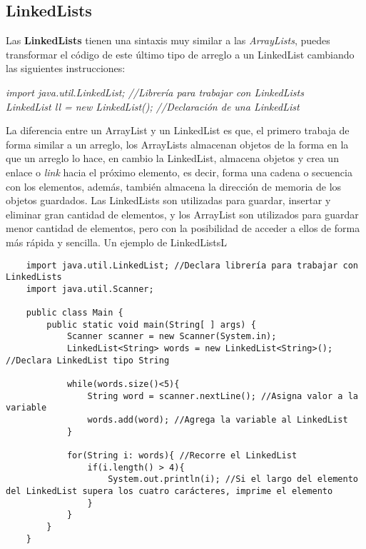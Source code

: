 \subsection{LinkedLists}
Las \textbf{LinkedLists} tienen una sintaxis muy similar a las \textit{ArrayLists}, puedes transformar el código de este último tipo de arreglo a un LinkedList cambiando las siguientes instrucciones:\begin{center}\textit{import java.util.LinkedList; //Librería para trabajar con LinkedLists\\LinkedList ll = new LinkedList(); //Declaración de una LinkedList}\end{center}
La diferencia entre un ArrayList y un LinkedList es que, el primero trabaja de forma similar a un arreglo, los ArrayLists almacenan objetos de la forma en la que un arreglo lo hace, en cambio la LinkedList, almacena objetos y crea un enlace o \textit{link} hacia el próximo elemento, es decir, forma una cadena o secuencia con los elementos, además, también almacena la dirección de memoria de los objetos guardados. Las LinkedLists son utilizadas para guardar, insertar y eliminar gran cantidad de elementos, y los ArrayList son utilizados para guardar menor cantidad de elementos, pero con la posibilidad de acceder a ellos de forma más rápida y sencilla. Un ejemplo de LinkedListsL
\begin{lstlisting}
    import java.util.LinkedList; //Declara librería para trabajar con LinkedLists
    import java.util.Scanner;

    public class Main {
        public static void main(String[ ] args) {
	        Scanner scanner = new Scanner(System.in);
            LinkedList<String> words = new LinkedList<String>(); //Declara LinkedList tipo String
        
            while(words.size()<5){
                String word = scanner.nextLine(); //Asigna valor a la variable
                words.add(word); //Agrega la variable al LinkedList
            }
        
            for(String i: words){ //Recorre el LinkedList
                if(i.length() > 4){
                    System.out.println(i); //Si el largo del elemento del LinkedList supera los cuatro carácteres, imprime el elemento
                }
            }
        }
    }
\end{lstlisting}


